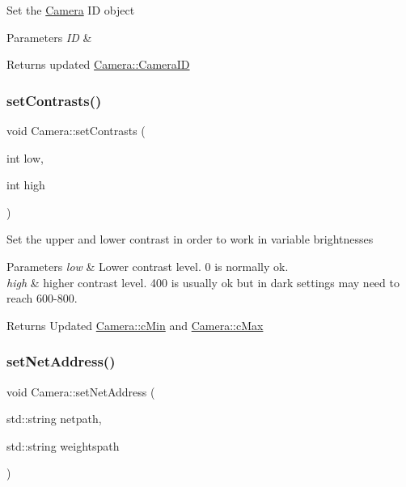 Set the \hyperlink{classCamera}{Camera} ID object


\begin{DoxyParams}{Parameters}
{\em ID} & \\
\hline
\end{DoxyParams}
\begin{DoxyReturn}{Returns}
updated \hyperlink{classCamera_a96c19741cb6ba7a897ca90746e8b8918}{Camera\+::\+Camera\+ID} 
\end{DoxyReturn}
\mbox{\label{classCamera_aef0a4ebb556d5a2a0f13e5d120c05259}} 
\subsubsection{\texorpdfstring{set\+Contrasts()}{setContrasts()}}
{\footnotesize\ttfamily void Camera\+::set\+Contrasts (\begin{DoxyParamCaption}\item[{int}]{low,  }\item[{int}]{high }\end{DoxyParamCaption})}

Set the upper and lower contrast in order to work in variable brightnesses


\begin{DoxyParams}{Parameters}
{\em low} & Lower contrast level. 0 is normally ok.\\
\hline
{\em high} & higher contrast level. 400 is usually ok but in dark settings may need to reach 600-\/800.\\
\hline
\end{DoxyParams}
\begin{DoxyReturn}{Returns}
Updated \hyperlink{classCamera_ab6f982f42917eb9ef75606e97fc82911}{Camera\+::c\+Min} and \hyperlink{classCamera_ad784af65b7f7e1b6ebb9b33df774d7db}{Camera\+::c\+Max} 
\end{DoxyReturn}
\mbox{\label{classCamera_a3595618ceff1b74e79633b4132ada11f}} 
\subsubsection{\texorpdfstring{set\+Net\+Address()}{setNetAddress()}}
{\footnotesize\ttfamily void Camera\+::set\+Net\+Address (\begin{DoxyParamCaption}\item[{std\+::string}]{netpath,  }\item[{std\+::string}]{weightspath }\end{DoxyParamCaption})}

